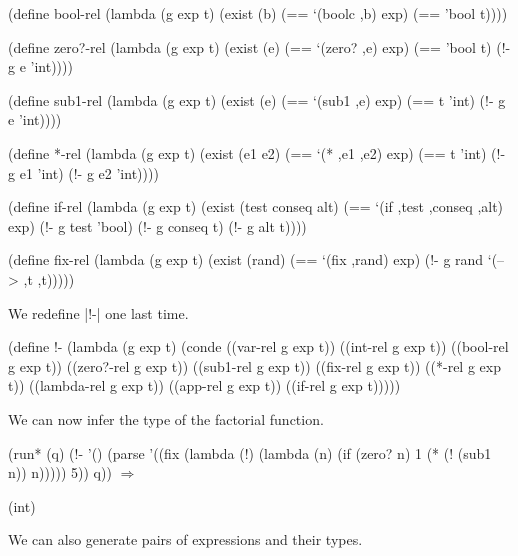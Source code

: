 \schemedisplayspace
\begin{schemedisplay}
(define bool-rel
  (lambda (g exp t)
    (exist (b)
      (== `(boolc ,b) exp)
      (== 'bool t))))

(define zero?-rel
  (lambda (g exp t)
    (exist (e)
      (== `(zero? ,e) exp)
      (== 'bool t)
      (!- g e 'int))))

(define sub1-rel
  (lambda (g exp t)
    (exist (e)
      (== `(sub1 ,e) exp)
      (== t 'int)
      (!- g e 'int))))

 (define *-rel
  (lambda (g exp t)
    (exist (e1 e2)
      (== `(* ,e1 ,e2) exp)
      (== t 'int)
      (!- g e1 'int)
      (!- g e2 'int))))

(define if-rel
  (lambda (g exp t)
    (exist (test conseq alt)
      (== `(if ,test ,conseq ,alt) exp)
      (!- g test 'bool)
      (!- g conseq t)
      (!- g alt t))))
\end{schemedisplay}

\begin{schemedisplay}
(define fix-rel
  (lambda (g exp t)
    (exist (rand)
      (== `(fix ,rand) exp)
      (!- g rand `(--> ,t ,t)))))
\end{schemedisplay}

We redefine \scheme|!-| one last time.

\enlargethispage{2em}

\schemedisplayspace
\begin{schemedisplay}
(define !-
  (lambda (g exp t)
    (conde
      ((var-rel g exp t))
      ((int-rel g exp t))
      ((bool-rel g exp t))
      ((zero?-rel g exp t))
      ((sub1-rel g exp t))
      ((fix-rel g exp t))
      ((*-rel g exp t))
      ((lambda-rel g exp t))
      ((app-rel g exp t))
      ((if-rel g exp t)))))
\end{schemedisplay}

We can now infer the type of the factorial function.

\schemedisplayspace
\begin{schemedisplay}
(run* (q)
  (!- '() (parse '((fix (lambda (!)
                          (lambda (n)
                            (if (zero? n)
                                1
                                (* (! (sub1 n)) n))))) 5))
      q)) $\Rightarrow$
\end{schemedisplay}
\nspace
\begin{schemeresponse}
(int)
\end{schemeresponse}

We can also generate pairs of expressions and their types.

